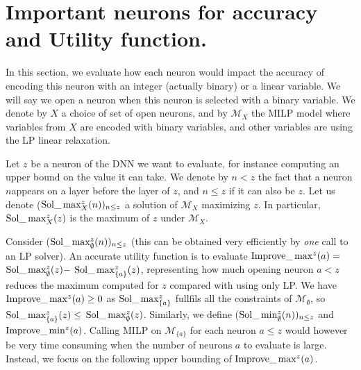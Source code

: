 \section{Important neurons for accuracy and Utility function.}

In this section, we evaluate how each neuron would impact the accuracy of encoding this neuron with an integer (actually binary) or a linear variable. We will say we open a neuron when this neuron is selected with a binary variable. We denote by $X$ a choice of set of open neurons, and by $\mathcal{M}_X$ the MILP model where variables from $X$ are encoded with binary variables, and other variables are using the LP linear relaxation.

Let $z$ be a neuron of the DNN we want to evaluate, for instance computing an upper bound on the value it can take. We denote by $n < z$ the fact that a neuron $n$appears on a layer before the layer of $z$, and $n \leq z$ if it can also be $z$.
Let us denote ($\mathrm{Sol}\_\max_X^z(n))_{n \leq z}$ a solution of $\mathcal{M}_X$ 
maximizing $z$. In particular, $\mathrm{Sol}\_\max_X^z(z)$ is the maximum of $z$ under $\mathcal{M}_X$.

Consider ($\mathrm{Sol}\_\max_\emptyset^z(n))_{n \leq z}$ (this can be obtained very efficiently by {\em one} call to an LP solver). An accurate utility function is to evaluate 
$\mathrm{Improve}\_\max^z(a)=$ $\mathrm{Sol}\_\max_\emptyset^z(z) -$ $\mathrm{Sol}\_\max_{\{a\}}^z(z)$, 
representing how much opening neuron $a < z$ reduces the maximum computed for $z$
compared with using only LP. 
We have $\mathrm{Improve}\_\max^z(a)\geq 0$ as $\mathrm{Sol}\_\max_{\{a\}}^z$ fullfils all the constraints of 
$\mathcal{M}_\emptyset$, so $\mathrm{Sol}\_\max_{\{a\}}^z(z) \leq$ $\mathrm{Sol}\_\max_\emptyset^z(z)$.
Similarly, we define ($\mathrm{Sol}\_\min_\emptyset^z(n))_{n \leq z}$ and 
$\mathrm{Improve}\_\min^z(a)$. Calling MILP on $\mathcal{M}_{\{a\}}$ for each neuron $a \leq z$
would however be very time consuming when the number of neurons $a$ to evaluate is large.
Instead, we focus on the following upper bounding of $\mathrm{Improve}\_\max^z(a)$.








